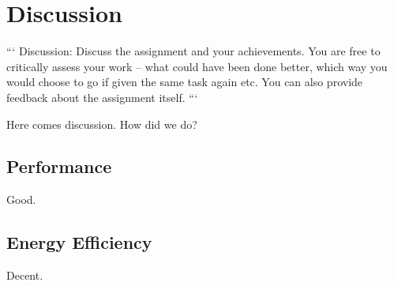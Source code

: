 \section{Discussion}

```
Discussion: Discuss the assignment and your achievements.
You are free to critically assess your work – what could have been done better, which way you would choose to go if given the same task again etc.
You can also provide feedback about the assignment itself.
```

Here comes discussion. How did we do?

\subsection{Performance}
Good.

\subsection{Energy Efficiency}
Decent.
